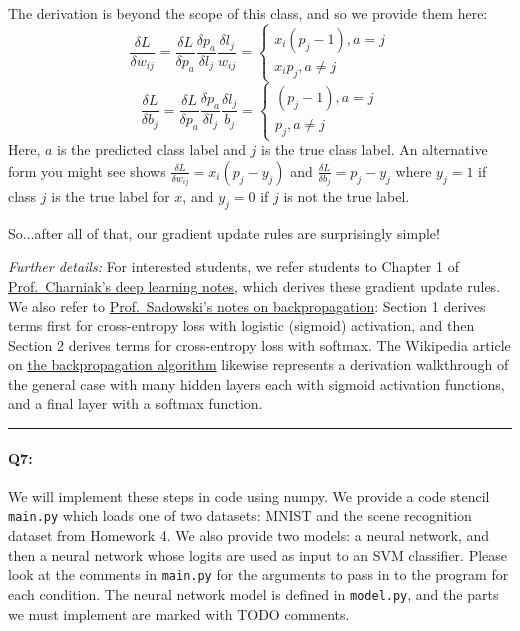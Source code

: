 The derivation is beyond the scope of this class, and so we provide them here:
\begin{equation}
\frac{\delta L}{\delta w_{ij}} = \frac{\delta L}{\delta p_a} \frac{\delta p_a}{\delta l_j} \frac{\delta l_j}{w_{ij}} =\begin{cases}
x_i(p_j-1), a = j\\
x_ip_j,  a\neq j
\end{cases}
\label{eq:wupdate}
\end{equation}
\begin{equation}
\frac{\delta L}{\delta b_j} = \frac{\delta L}{\delta p_a} \frac{\delta p_a}{\delta l_j} \frac{\delta l_j}{b_j} =\begin{cases}
(p_j-1), a = j\\
p_j,  a\neq j
\end{cases}
\label{eq:bupdate}
\end{equation}
Here, $a$ is the predicted class label and $j$ is the true class label. An alternative form you might see shows $\frac{\delta L}{\delta w_{ij}} = x_i(p_j-y_j)$ and $\frac{\delta L}{\delta b_j} = p_j-y_j$ where $y_j=1$ if class $j$ is the true label for $x$, and $y_j = 0$ if $j$ is not the true label.

So...after all of that, our gradient update rules are surprisingly simple!

\emph{Further details:} For interested students, we refer students to Chapter 1 of \href{https://cs.brown.edu/courses/csci1460/assets/files/deep-learning.pdf}{Prof.~Charniak's deep learning notes}, which derives these gradient update rules. We also refer to \href{https://www.ics.uci.edu/~pjsadows/notes.pdf}{Prof.~Sadowski's notes on backpropagation}: Section 1 derives terms first for cross-entropy loss with logistic (sigmoid) activation, and then Section 2 derives terms for cross-entropy loss with softmax. The Wikipedia article on \href{https://en.wikipedia.org/wiki/Backpropagation}{the backpropagation algorithm} likewise represents a derivation walkthrough of the general case with many hidden layers each with sigmoid activation functions, and a final layer with a softmax function.

\hspace{\fill}\rule{0.5\linewidth}{.5pt}\hspace{\fill}


\paragraph{Q7:} We will implement these steps in code using numpy. We provide a code stencil \texttt{main.py} which loads one of two datasets: MNIST and the scene recognition dataset from Homework 4. We also provide two models: a neural network, and then a neural network whose logits are used as input to an SVM classifier. Please look at the comments in \texttt{main.py} for the arguments to pass in to the program for each condition. The neural network model is defined in \texttt{model.py}, and the parts we must implement are marked with TODO comments.


